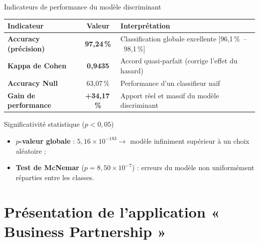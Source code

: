 \documentclass[aspectratio=169, 10pt]{beamer}
\begin{document}
\begin{frame}{Indicateurs de performance du modèle discriminant}
    \begin{center}
        \small
        \renewcommand{\arraystretch}{1.2}
        \begin{tabular}{l|c|l}
            \toprule
            \textbf{Indicateur} & \textbf{Valeur} & \textbf{Interprétation} \\
            \midrule
            \textbf{Accuracy (précision)} & \textbf{97,24\,\%} & Classification globale excellente [96,1\,\%~--~98,1\,\%] \\
            \rowcolor{gray!5}
            \textbf{Kappa de Cohen} & \textbf{0,9435} & Accord quasi-parfait (corrige l'effet du hasard) \\
            \textbf{Accuracy Null} & 63,07\,\% & Performance d'un classifieur naïf \\
            \rowcolor{gray!5}
            \textbf{Gain de performance} & \alert{\textbf{+34,17\,\%}} & Apport réel et massif du modèle discriminant \\
            \bottomrule
        \end{tabular}
    \end{center}
    \vfill
    \begin{block}{Significativité statistique ($p < 0,05$)}
        \begin{itemize}
            \small
            \item \textbf{$p$-valeur globale} : $5,16 \times 10^{-183} \rightarrow$ modèle infiniment supérieur à un choix aléatoire ;
            \item \textbf{Test de McNemar} ($p = 8,50 \times 10^{-7}$) : erreurs du modèle non uniformément réparties entre les classes.
        \end{itemize}
    \end{block}
\end{frame}

\section{Présentation de l'application « Business Partnership »}
\end{document}
